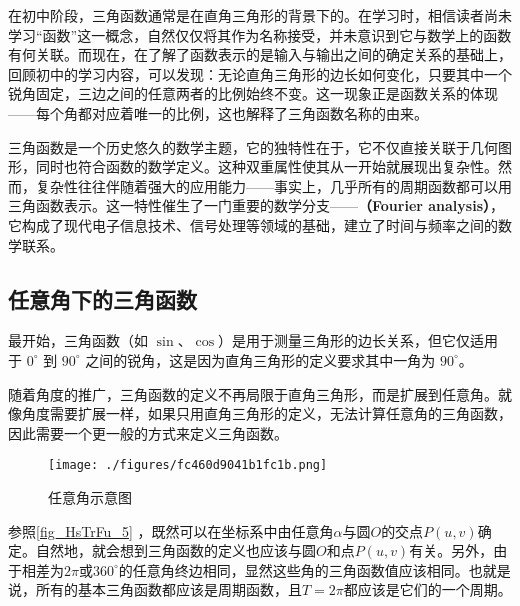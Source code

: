 \begin{issues}
\issueDraft
\end{issues}

在初中阶段，三角函数通常是在直角三角形的背景下的。在学习时，相信读者尚未学习“函数”这一概念，自然仅仅将其作为名称接受，并未意识到它与数学上的函数有何关联。而现在，在了解了函数表示的是输入与输出之间的确定关系的基础上，回顾初中的学习内容，可以发现：无论直角三角形的边长如何变化，只要其中一个锐角固定，三边之间的任意两者的比例始终不变。这一现象正是函数关系的体现——每个角都对应着唯一的比例，这也解释了三角函数名称的由来。

三角函数是一个历史悠久的数学主题，它的独特性在于，它不仅直接关联于几何图形，同时也符合函数的数学定义。这种双重属性使其从一开始就展现出复杂性。然而，复杂性往往伴随着强大的应用能力——事实上，几乎所有的周期函数都可以用三角函数表示。这一特性催生了一门重要的数学分支——\textbf{（Fourier analysis）}，它构成了现代电子信息技术、信号处理等领域的基础，建立了时间与频率之间的数学联系。



\subsection{任意角下的三角函数}

最开始，三角函数（如 $\sin$、$\cos$）是用于测量三角形的边长关系，但它仅适用于 $0^\circ$ 到 $90^\circ$ 之间的锐角，这是因为直角三角形的定义要求其中一角为 $90^\circ$。

随着角度的推广，三角函数的定义不再局限于直角三角形，而是扩展到任意角。就像角度需要扩展一样，如果只用直角三角形的定义，无法计算任意角的三角函数，因此需要一个更一般的方式来定义三角函数。

\begin{figure}[ht]
\centering
\texttt{[image: ./figures/fc460d9041b1fc1b.png]}
\caption{任意角示意图} \label{fig_HsTrFu_5}
\end{figure}

参照\autoref{fig_HsTrFu_5} ，既然可以在坐标系中由任意角$\alpha$与圆$O$的交点$P(u,v)$确定。自然地，就会想到三角函数的定义也应该与圆$O$和点$P(u,v)$有关。另外，由于相差为$2\pi$或$360^\circ$的任意角终边相同，显然这些角的三角函数值应该相同。也就是说，所有的基本三角函数都应该是周期函数，且$T=2\pi$都应该是它们的一个周期。


